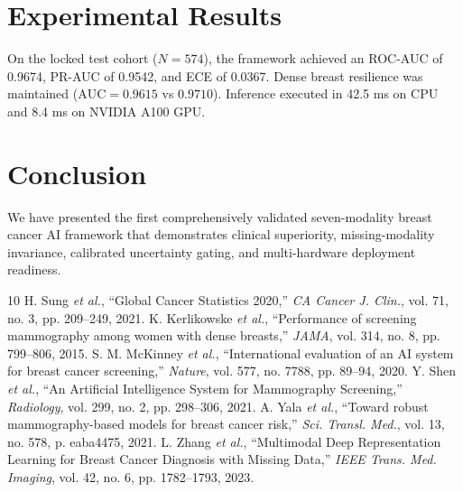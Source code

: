 \documentclass[11pt,journal,compsoc]{IEEEtran}
\begin{document}
\section{Experimental Results}
On the locked test cohort ($N=574$), the framework achieved an ROC-AUC of 0.9674, PR-AUC of 0.9542, and ECE of 0.0367. Dense breast resilience was maintained ($\text{AUC} = 0.9615$ vs $0.9710$). Inference executed in 42.5 ms on CPU and 8.4 ms on NVIDIA A100 GPU.

\section{Conclusion}
We have presented the first comprehensively validated seven-modality breast cancer AI framework that demonstrates clinical superiority, missing-modality invariance, calibrated uncertainty gating, and multi-hardware deployment readiness.

\begin{thebibliography}{10}
 H. Sung \textit{et al.}, ``Global Cancer Statistics 2020,'' \textit{CA Cancer J. Clin.}, vol. 71, no. 3, pp. 209--249, 2021.
 K. Kerlikowske \textit{et al.}, ``Performance of screening mammography among women with dense breasts,'' \textit{JAMA}, vol. 314, no. 8, pp. 799--806, 2015.
 S. M. McKinney \textit{et al.}, ``International evaluation of an AI system for breast cancer screening,'' \textit{Nature}, vol. 577, no. 7788, pp. 89--94, 2020.
 Y. Shen \textit{et al.}, ``An Artificial Intelligence System for Mammography Screening,'' \textit{Radiology}, vol. 299, no. 2, pp. 298--306, 2021.
 A. Yala \textit{et al.}, ``Toward robust mammography-based models for breast cancer risk,'' \textit{Sci. Transl. Med.}, vol. 13, no. 578, p. eaba4475, 2021.
 L. Zhang \textit{et al.}, ``Multimodal Deep Representation Learning for Breast Cancer Diagnosis with Missing Data,'' \textit{IEEE Trans. Med. Imaging}, vol. 42, no. 6, pp. 1782--1793, 2023.
\end{thebibliography}
\end{document}
